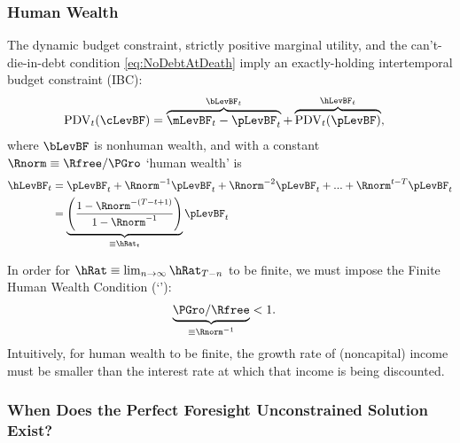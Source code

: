 \documentclass[BufferStockTheory]{subfiles}
\begin{document}
\subsubsection{Human Wealth}
The dynamic budget constraint, strictly positive marginal utility, and the can't-die-in-debt condition \eqref{eq:NoDebtAtDeath} imply an exactly-holding intertemporal budget constraint (IBC):
\begin{align}
  \mathrm{PDV}_{t}(\cLevBF)  & = \overbrace{\mLevBF_{t}-\pLevBF_{t}}^{\bLevBF_{t}}+\overbrace{\mathrm{PDV}_{t}(\pLevBF)}^{\hLevBF_{t}}, \label{eq:IBCFinite}
\end{align} \hypertarget{FHWF}{}
where $\bLevBF$ is nonhuman wealth, and with a constant $\Rnorm \equiv \Rfree/\PGro$ `human wealth' is
\begin{align}
  \hLevBF_{t}  & = \pLevBF_{t}+\Rnorm^{-1} \pLevBF_{t} + \Rnorm^{-2} \pLevBF_{t} + ... + \Rnorm^{t-T} \pLevBF_{t} \notag 
  \\  & = \underbrace{\left(\frac{1-\Rnorm^{-(T-t+1)}}{1-\Rnorm^{-1}}\right)}_{\equiv \hRat_{t}}\pLevBF_{t} \label{eq:HDef}
\end{align}

\hypertarget{FHWC}{}
In order for $\hRat \equiv \lim_{n \rightarrow
  \infty} \hRat_{T-n}$ to be finite, we must
impose the Finite Human Wealth Condition (`\FHWC'): 
\begin{align}
  \underbrace{\PGro/\Rfree}_{\equiv \Rnorm^{-1}}  & < 1 \label{eq:FHWC}.
\end{align}
Intuitively, for human wealth to be finite, the growth rate of (noncapital) income must be smaller than the interest rate at which that income is being discounted.

\hypertarget{Unconstrained-Solution}{}
\hypertarget{PF-Unconstrained-Solution}{}
\subsubsection{When Does the Perfect Foresight Unconstrained Solution Exist?} \label{subsec:PFUncon}

\hypertarget{APF}{}
\hypertarget{AIC}{}
\end{document}
